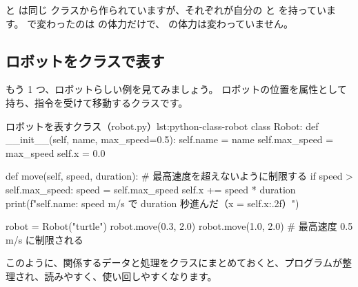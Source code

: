  と  は同じ  クラスから作られていますが、それぞれが自分の  と  を持っています。
 で変わったのは  の体力だけで、 の体力は変わっていません。

\subsection{ロボットをクラスで表す}

もう 1 つ、ロボットらしい例を見てみましょう。
ロボットの位置を属性として持ち、指令を受けて移動するクラスです。

\begin{codelisting}[style=python]{ロボットを表すクラス（robot.py）}{lst:python-class-robot}
class Robot:
    def __init__(self, name, max_speed=0.5):
        self.name = name
        self.max_speed = max_speed
        self.x = 0.0

    def move(self, speed, duration):
        # 最高速度を超えないように制限する
        if speed > self.max_speed:
            speed = self.max_speed
        self.x += speed * duration
        print(f"{self.name}: {speed} m/s で {duration} 秒進んだ（x = {self.x:.2f}）")


robot = Robot("turtle")
robot.move(0.3, 2.0)
robot.move(1.0, 2.0)   # 最高速度 0.5 m/s に制限される
\end{codelisting}


このように、関係するデータと処理をクラスにまとめておくと、プログラムが整理され、読みやすく、使い回しやすくなります。

